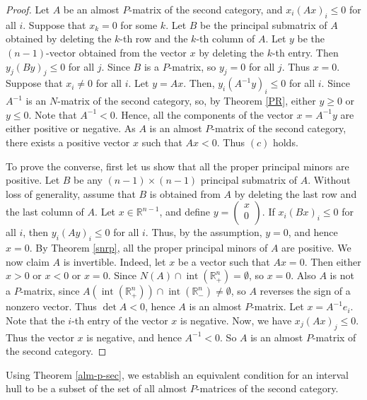 \documentclass[11pt]{article}
\DeclareMathOperator{\inte }{int}
\begin{document}
\begin{proof}
    Let $A$ be an almost $P$-matrix of the second category, and $x_i (Ax)_i \leq 0$ for all $i$. Suppose that  $x_k =0$ for some $k$. Let $B$ be the principal submatrix of $A$ obtained by deleting the $k$-th row and the $k$-th column of $A$. Let $y$ be the $(n-1)$-vector obtained from the vector $x$ by deleting the $k$-th entry. Then  $y_j (By)_j \leq 0$ for all $j$. Since $B$ is a $P$-matrix, so $y_j=0$ for all $j$.  Thus $x =0.$ Suppose that $x_i \neq 0$ for all $i$.  Let $y = Ax$. Then, $y_i(A^{-1}y)_i \leq 0$  for all $i$. Since $A^{-1}$ is an $N$-matrix of the second category, so, by Theorem \ref{PR}, either $y \geq 0$ or $y \leq 0$.  Note that $A^{-1}<0$. Hence, all the components of the vector $x = A^{-1} y$ are   either positive or negative. As $A$ is an almost $P$-matrix of the second category, there exists a positive vector $x$ such that $Ax<0$. Thus $(c)$ holds.

To prove the converse, first let us show that all the proper principal minors are positive.  Let $B$ be any $(n-1) \times (n-1) $ principal submatrix of $A$. Without loss of generality, assume that $B$ is obtained from  $A$ by deleting the last row and the last column of $A$. Let $x \in \mathbb{R}^{n-1}$, and  define $y =  \begin{pmatrix}
            x\\
            0 \\
            \end{pmatrix}  $.
If $x_i(Bx)_i \leq 0$ for all $i$, then $y_i (Ay)_i \leq 0$ for all $i$.
Thus, by the assumption,  $y = 0$, and hence $x =0$. By Theorem
\ref{snrp}, all the proper principal minors of $A$ are positive. We now
claim $A$ is invertible. Indeed, let $x$ be a vector such that $Ax=0$. Then either $x>0$ or $x<0$ or $x=0$. Since $N(A) \cap  \inte (\mathbb{R}_+^n) = \emptyset$, so $x =0$. Also $A$ is not a $P$-matrix, since $A (\inte (\mathbb{R}_+^n)) \cap \inte (\mathbb{R}_-^n) \neq \emptyset$, so $A$ reverses the sign of a nonzero vector. Thus $\det A < 0$, hence $A$ is an almost $P$-matrix. Let $x  = A^{-1} e_i$. %
 Note that the $i$-th entry of the vector $x$ is negative. Now, we have  $x_j (Ax)_j \leq 0$. Thus the vector $x$ is negative, and hence $A^{-1} < 0$. So $A$ is an almost $P$-matrix of the second category.
 \end{proof}


 Using Theorem \ref{alm-p-sec}, we establish an equivalent condition for an  interval hull to be a subset of the set of all almost $P$-matrices of the second category.
\end{document}
